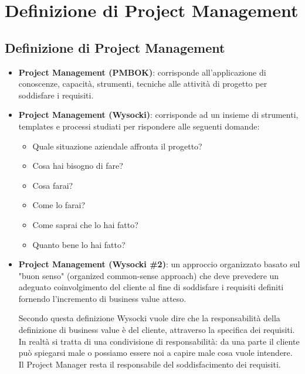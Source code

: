\section{Definizione di Project Management}
\subsection{Definizione di Project Management}
\begin{itemize}
	\item \textbf{Project Management (PMBOK)}: corrisponde all'applicazione di conoscenze, capacità, strumenti, tecniche alle attività di progetto per soddisfare i requisiti.
	\item \textbf{Project Management (Wysocki)}: corrisponde ad un insieme di strumenti, templates e processi studiati per rispondere alle seguenti domande:
	\begin{itemize}
		\item Quale situazione aziendale affronta il progetto?
		\item Cosa hai bisogno di fare?
		\item Cosa farai?
		\item Come lo farai?
		\item Come saprai che lo hai fatto?
		\item Quanto bene lo hai fatto?
	\end{itemize}
	\item \textbf{Project Management (Wysocki \#2)}: un approccio organizzato basato sul "buon senso" (organized common-sense approach) che deve prevedere un adeguato coinvolgimento del cliente al fine di soddisfare i requisiti definiti fornendo l'incremento di business value atteso.
	\begin{info}
		Secondo questa definizione Wysocki vuole dire che la responsabilità della definizione di business value è del cliente, attraverso la specifica dei requisiti. In realtà si tratta di una condivisione di responsabilità: da una parte il cliente può spiegarsi male o possiamo essere noi a capire male cosa vuole intendere. Il Project Manager resta il responsabile del soddisfacimento dei requisiti.
	\end{info}
\end{itemize}
